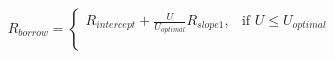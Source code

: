 \documentclass[preview]{standalone}
\begin{document}
\begin{align*}
R_{borrow} = \begin{cases} R_{intercept} + \frac{U}{U_{optimal}}R_{slope1}, & \text{if } U \leq U_{optimal} \\[6pt] & \text{ } \\ & \text{ } \end{cases}
\end{align*}
\end{document}
